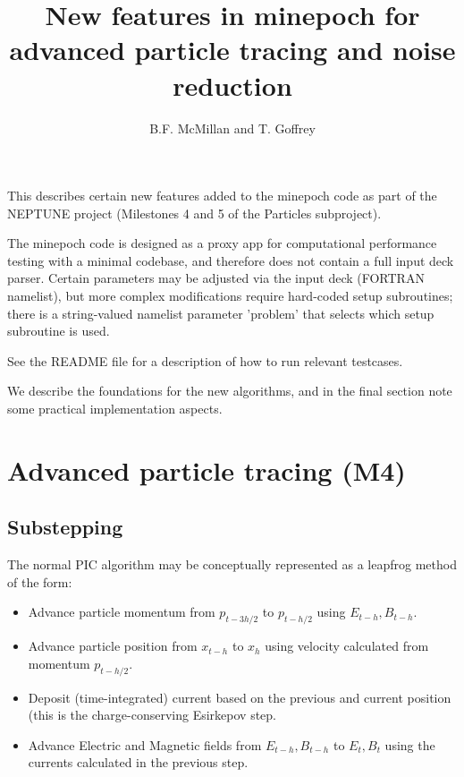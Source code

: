 \documentclass{article}
\title{New features in minepoch for advanced particle tracing and noise reduction}
\author{B.F. McMillan and T. Goffrey}
\begin{document}
\maketitle

This describes certain new features added to the minepoch code as part of the NEPTUNE project (Milestones 4 and 5 of the Particles subproject).

The minepoch code is designed as a proxy app for computational performance testing with a minimal codebase, and therefore does not contain a full input deck parser. Certain parameters may be adjusted via the input deck (FORTRAN namelist), but more complex modifications require hard-coded setup subroutines; there is a string-valued namelist parameter 'problem' that selects which setup subroutine is used.

See the README file for a description of how to run relevant testcases.

We describe the foundations for the new algorithms, and in the final section note some practical implementation aspects.

\section{Advanced particle tracing (M4)}

\subsection{Substepping}

The normal PIC algorithm\cite{Arber_EPOCH} may be conceptually represented as a leapfrog method of the form:

\begin{itemize}
\item
  Advance particle momentum from $p_{t-3 h/2}$ to $p_{t-h/2}$ using $E_{t-h}, B_{t-h}$.
\item
  Advance particle position from $x_{t-h}$ to $x_{h}$ using velocity calculated from momentum $p_{t-h/2}$.
\item
  Deposit (time-integrated) current based on the previous and current
  position (this is the charge-conserving Esirkepov step\cite{ESIRKEPOV2001}.
\item
  Advance Electric and Magnetic fields from $E_{t-h}, B_{t-h}$ to $E_t, B_t$ using the currents calculated in the previous step.
\end{itemize}
\end{document}
